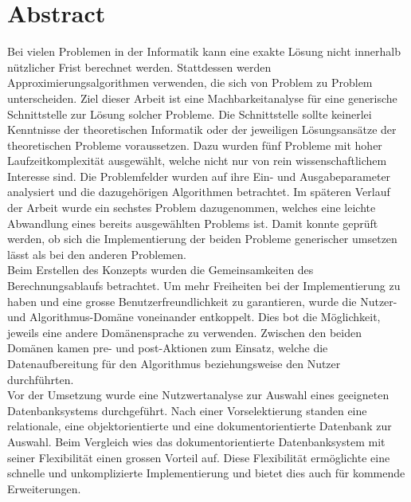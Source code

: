 %
%

\thispagestyle{empty}


\newpage
\thispagestyle{empty}
\chapter*{Abstract}\label{abstract}
Bei vielen Problemen in der Informatik kann eine exakte Lösung nicht innerhalb nützlicher Frist berechnet werden. Stattdessen werden Approximierungsalgorithmen verwenden, die sich von Problem 
zu Problem unterscheiden. Ziel dieser Arbeit ist eine Machbarkeitanalyse für eine generische Schnittstelle zur Lösung solcher Probleme. Die Schnittstelle sollte keinerlei Kenntnisse der theoretischen 
Informatik oder der jeweiligen Lösungsansätze der theoretischen Probleme voraussetzen. Dazu wurden fünf Probleme mit hoher Laufzeitkomplexität ausgewählt, welche nicht nur von rein 
wissenschaftlichem Interesse sind. Die Problemfelder wurden auf ihre Ein- und Ausgabeparameter analysiert und die dazugehörigen Algorithmen betrachtet. Im späteren Verlauf der Arbeit wurde 
ein sechstes Problem dazugenommen, welches eine leichte Abwandlung eines bereits ausgewählten Problems ist. Damit konnte geprüft werden, ob sich die Implementierung der beiden Probleme 
generischer umsetzen lässt als bei den anderen Problemen.\\

Beim Erstellen des Konzepts wurden die Gemeinsamkeiten des Berechnungsablaufs betrachtet. Um mehr Freiheiten bei der Implementierung zu haben und eine grosse Benutzerfreundlichkeit zu 
garantieren, wurde die Nutzer- und Algorithmus-Domäne voneinander entkoppelt. Dies bot die Möglichkeit, jeweils eine andere Domänensprache zu verwenden. Zwischen den beiden Domänen 
kamen pre- und post-Aktionen zum Einsatz, welche die Datenaufbereitung für den Algorithmus beziehungsweise den Nutzer durchführten.\\

Vor der Umsetzung wurde eine Nutzwertanalyse zur Auswahl eines geeigneten Datenbanksystems durchgeführt. Nach einer Vorselektierung standen eine relationale, eine objektorientierte und 
eine dokumentorientierte Datenbank zur Auswahl. Beim Vergleich wies das dokumentorientierte Datenbanksystem mit seiner Flexibilität einen grossen Vorteil auf. Diese Flexibilität ermöglichte eine 
schnelle und unkomplizierte Implementierung und bietet dies auch für kommende Erweiterungen.\\

